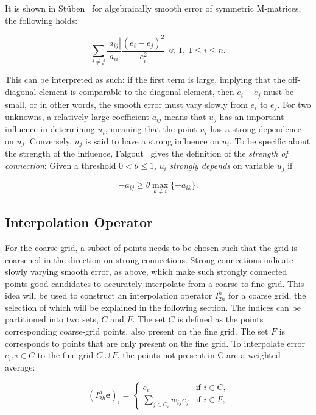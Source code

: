 It is shown in Stüben~\cite{Stuben1999} for algebraically smooth error of symmetric M-matrices, the following holds:

\begin{equation}
	\sum_{i \neq j}{\frac{|a_{ij}|}{a_{ii}}\frac{(e_i - e_j)^2}{e_i^2}} \ll 1,\ 1 \leq i \leq n.
	\label{eq:strong_connection}
\end{equation}

This can be interpreted as such: if the first term is large, implying that the off-diagonal element is comparable to the diagonal element, then $e_i - e_j$ must be small, or in other words, the smooth error must vary slowly from $e_i$ to $e_j$. For two unknowns, a relatively large coefficient $a_{ij}$ means that $u_j$ has an important influence in determining $u_i$, meaning that the point $u_i$ has a strong dependence on $u_j$. Conversely, $u_j$ is said to have a strong influence on $u_i$. To be specific about the strength of the influence, Falgout~\cite{Falgout2006} gives the definition of the \emph{strength of connection}: Given a threshold $0 < \theta \leq 1$, $u_i$ \emph{strongly depends} on variable $u_j$ if

\begin{equation}
-a_{ij} \geq \theta \max_{k \neq i}{\{-a_{ik}\}}.
\label{eq:strong_connection2}
\end{equation}

\subsection{Interpolation Operator} %

For the coarse grid, a subset of points needs to be chosen such that the grid is coarsened in the direction on strong connections. Strong connections indicate slowly varying smooth error, as above, which make such strongly connected points good candidates to accurately interpolate from a coarse to fine grid. This idea will be used to construct an interpolation operator $I_{2h}^h$ for a coarse grid, the selection of which will be explained in the following section. The indices can be partitioned into two sets, $C$ and $F$. The set $C$ is defined as the points corresponding coarse-grid points, also present on the fine grid. The set $F$ is corresponds to points that are only present on the fine grid. To interpolate error $e_i, i \in C$ to the fine grid $C \cup F$, the points not present in C are a weighted average:

\begin{equation}
	(I_{2h}^h\mathbf{e})_i =
		\begin{cases}
			e_i & \text{if $i \in C$,} \\
			\displaystyle \sum_{j \in C_i}{w_{ij}e_j} & \text{if $i \in F$,}
		\end{cases}
	\label{eq:interpolation_operator}
\end{equation}

